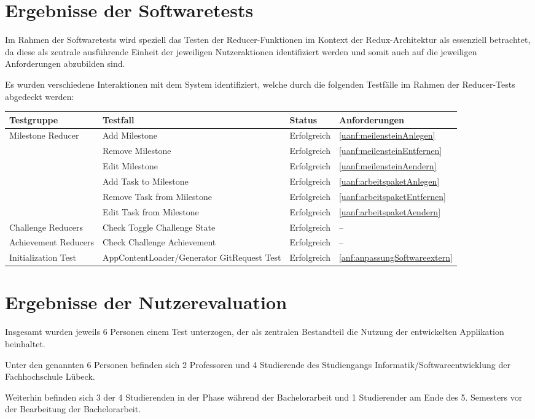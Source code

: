 \documentclass[bibliography=totoc,listof=totoc,BCOR=5mm,DIV=12,oneside]{scrbook}
\begin{document}
{\section{Ergebnisse der Softwaretests}
\par Im Rahmen der Softwaretests wird speziell das Testen der Reducer-Funktionen im Kontext der Redux-Architektur als essenziell betrachtet, da diese als zentrale ausführende Einheit der jeweiligen Nutzeraktionen identifiziert werden und somit auch auf die jeweiligen Anforderungen abzubilden sind.

\par \bigskip Es wurden verschiedene Interaktionen mit dem System identifiziert, welche durch die folgenden Testfälle im Rahmen der Reducer-Tests abgedeckt werden: 

\bigskip
\begin{tabularx}{\textwidth}{l|X|l|l}
	\toprule
	\textbf{Testgruppe} & \textbf{Testfall} & \textbf{Status} & \textbf{Anforderungen}\\ 
	\midrule
 	Milestone Reducer & Add Milestone & Erfolgreich & \ref{uanf:meilensteinAnlegen}\\ 
 	& Remove Milestone & Erfolgreich & \ref{uanf:meilensteinEntfernen}\\ 
 	& Edit Milestone & Erfolgreich & \ref{uanf:meilensteinAendern}\\
 	& Add Task to Milestone & Erfolgreich & \ref{uanf:arbeitspaketAnlegen}\\
 	& Remove Task from Milestone & Erfolgreich & \ref{uanf:arbeitspaketEntfernen}\\
 	& Edit Task from Milestone & Erfolgreich & \ref{uanf:arbeitspaketAendern}\\ 
 	\midrule
 	Challenge Reducers & Check Toggle Challenge State & Erfolgreich & --\\
 	\midrule
 	Achievement Reducers & Check Challenge Achievement & Erfolgreich & 	--\\
 	\midrule
 	Initialization Test & AppContentLoader/Generator GitRequest Test & Erfolgreich & \ref{anf:anpassungSoftwareextern}
 	\\ 
	\bottomrule
\end{tabularx}
\label{tab:reducertests}

\newpage
\section{Ergebnisse der Nutzerevaluation}
\par Insgesamt wurden jeweils 6 Personen einem Test unterzogen, der als zentralen Bestandteil die Nutzung der entwickelten Applikation beinhaltet. 
\par Unter den genannten 6 Personen befinden sich 2 Professoren und 4 Studierende des Studiengangs Informatik/Softwareentwicklung der Fachhochschule Lübeck. 
\par Weiterhin befinden sich 3 der 4 Studierenden in der Phase während der Bachelorarbeit und 1 Studierender am Ende des 5. Semesters vor der Bearbeitung der Bachelorarbeit.

}
\end{document}
